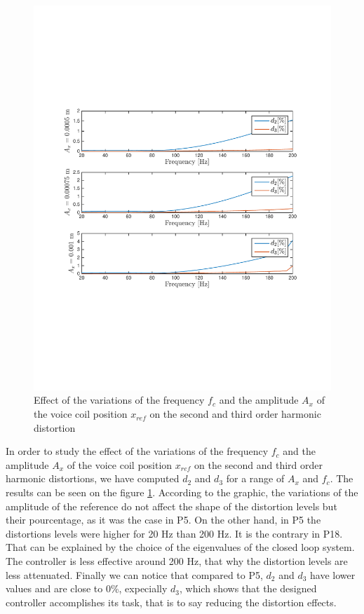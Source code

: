\begin{figure}[H]
 \centering 
 \includegraphics[trim=2cm 7cm 2cm 7cm, clip=true, totalheight=0.35\textheight, angle=0]{figures/P18d2d3.pdf}
 \caption{Effect of the variations of the frequency $f_c$ and the amplitude $A_x$ of the voice coil position $x_{ref}$ on the second and third order harmonic distortion}
 \label{fig:d2d3P18}
\end{figure}

In order to study the effect of the variations of the frequency $f_c$ and the amplitude $A_x$ of the voice coil position $x_{ref}$ on the second and third order harmonic distortions, we have computed $d_2$ and $d_3$ for a range of $A_x$ and $f_c$. The results can be seen on the figure \ref{fig:d2d3P18}. According to the graphic, the variations of the amplitude of the reference do not affect the shape of the distortion levels but their pourcentage, as it was the case in P5. On the other hand, in P5 the distortions levels were higher for 20 Hz than 200 Hz. It is the contrary in P18. That can be explained by the choice of the eigenvalues of the closed loop system. The controller is less effective around 200 Hz, that why the distortion levels are less attenuated. Finally we can notice that compared to P5, $d_2$ and $d_3$ have lower values and are close to 0\%, expecially $d_3$, which shows that the designed controller accomplishes its task, that is to say reducing the distortion effects.